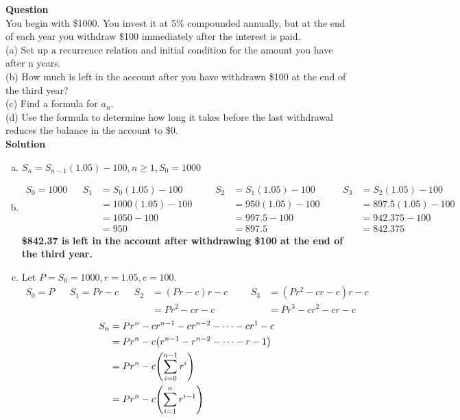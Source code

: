 \documentclass[article,12pt]{article}
\newcounter{question}
\def\questionnum{{\Large\bfseries{Question \arabic{question} }}\\[1em]}
\newcommand{\question}{
    \stepcounter{question}
    \questionnum
}
\newcommand{\solution}{
    {{\large\bfseries{Solution}}}
}
\DeclarePairedDelimiter\paren{(}{)}
\begin{document}
\question
You begin with \$1000. You invest it at 5\% compounded annually, but at the end of each year you withdraw \$100 immediately after the interest is paid.\\(a) Set up a recurrence relation and initial condition for the amount you have after n years.\\(b) How much is left in the account after you have withdrawn \$100 at the end of the third year?\\(c) Find a formula for $a_n$.\\(d) Use the formula to determine how long it takes before the last withdrawal reduces the balance in the account to \$0.\\

\solution
\begin{enumerate}[(a)]
    \item 
    $S_n = S_{n-1}(1.05) - 100, n \geq 1, S_0 = 1000$
    \item
    \begin{align*}
        S_0 = 1000 && S_1 &= S_0(1.05) - 100  &&& S_2 &= S_1(1.05) - 100 &&& S_3 &= S_2(1.05) - 100 \\
                   &&     &= 1000(1.05) - 100 &&&     &= 950(1.05) - 100 &&&     &= 897.5(1.05) - 100 \\
                   &&     &= 1050 - 100       &&&     &= 997.5 - 100     &&&     &= 942.375 - 100 \\
                   &&     &= 950              &&&     &= 897.5           &&&     &= 842.375
    \end{align*}
    \textbf{\$842.37 is left in the account after withdrawing \$100 at the end of the third year.}
    \item 
    Let $P = S_0 = 1000, r = 1.05, c=100$.
    \begin{align*}
        S_0 = P && S_1 = Pr - c && S_2 &= (Pr - c)r - c &&& S_3 &= (Pr^2 - cr - c)r - c \\
                &&              &&     &= Pr^2 - cr - c &&&     &= Pr^3 - cr^2 - cr - c
    \end{align*}
    \begin{align*}
        S_n &= Pr^n - cr^{n-1} - cr^{n-2} - \cdots - cr^1 - c \\
            &= Pr^n - c\paren*{r^{n-1} - r^{n-2} - \cdots - r - 1} \\
            &= Pr^n - c\paren*{\sum_{i=0}^{n-1} r^i} \\
            &= Pr^n - c\paren*{\sum_{i=1}^{n} r^{i-1}} \\

\end{align*}
\end{enumerate}
\end{document}
